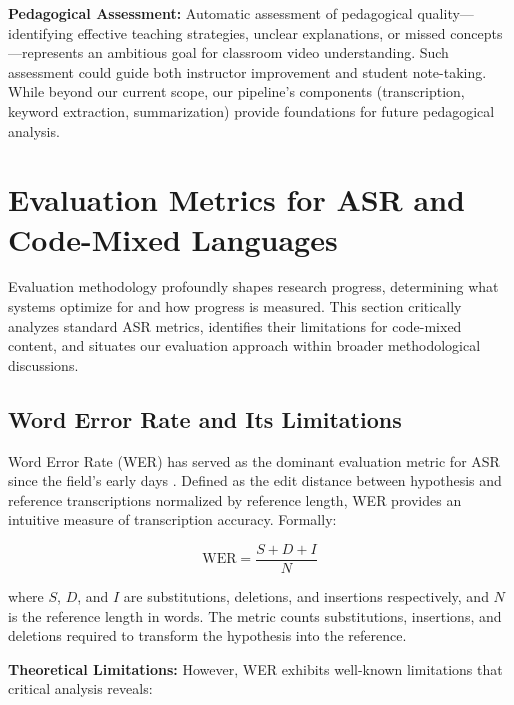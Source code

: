 \textbf{Pedagogical Assessment:} Automatic assessment of pedagogical quality---identifying effective teaching strategies, unclear explanations, or missed concepts---represents an ambitious goal for classroom video understanding. Such assessment could guide both instructor improvement and student note-taking. While beyond our current scope, our pipeline's components (transcription, keyword extraction, summarization) provide foundations for future pedagogical analysis.

\section{Evaluation Metrics for ASR and Code-Mixed Languages}

Evaluation methodology profoundly shapes research progress, determining what systems optimize for and how progress is measured. This section critically analyzes standard ASR metrics, identifies their limitations for code-mixed content, and situates our evaluation approach within broader methodological discussions.

\subsection{Word Error Rate and Its Limitations}

Word Error Rate (WER) has served as the dominant evaluation metric for ASR since the field's early days \cite{Jurafsky2000}. Defined as the edit distance between hypothesis and reference transcriptions normalized by reference length, WER provides an intuitive measure of transcription accuracy. Formally:

\[
\text{WER} = \frac{S + D + I}{N}
\]

where $S$, $D$, and $I$ are substitutions, deletions, and insertions respectively, and $N$ is the reference length in words. The metric counts substitutions, insertions, and deletions required to transform the hypothesis into the reference.

\textbf{Theoretical Limitations:} However, WER exhibits well-known limitations that critical analysis reveals:

